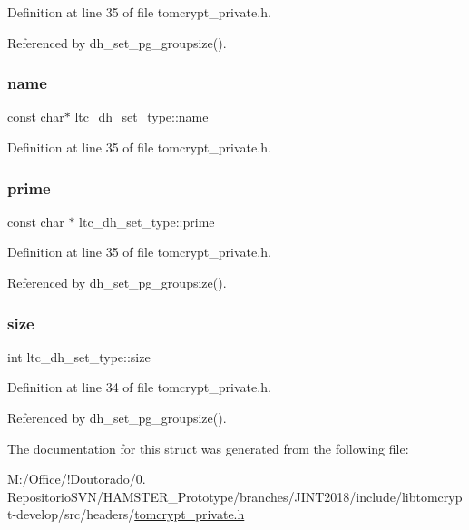 Definition at line 35 of file tomcrypt\+\_\+private.\+h.



Referenced by dh\+\_\+set\+\_\+pg\+\_\+groupsize().

\mbox{\label{structltc__dh__set__type_ac610a2795fa141eb47c6bc75db1f100d}} 
\subsubsection{\texorpdfstring{name}{name}}
{\footnotesize\ttfamily const char$\ast$ ltc\+\_\+dh\+\_\+set\+\_\+type\+::name}



Definition at line 35 of file tomcrypt\+\_\+private.\+h.

\mbox{\label{structltc__dh__set__type_a075dd36bc203e54e802194a7a0ac4d0a}} 
\subsubsection{\texorpdfstring{prime}{prime}}
{\footnotesize\ttfamily const char $\ast$ ltc\+\_\+dh\+\_\+set\+\_\+type\+::prime}



Definition at line 35 of file tomcrypt\+\_\+private.\+h.



Referenced by dh\+\_\+set\+\_\+pg\+\_\+groupsize().

\mbox{\label{structltc__dh__set__type_a2b9cb28186fe61b5f2c86195af6fb397}} 
\subsubsection{\texorpdfstring{size}{size}}
{\footnotesize\ttfamily int ltc\+\_\+dh\+\_\+set\+\_\+type\+::size}



Definition at line 34 of file tomcrypt\+\_\+private.\+h.



Referenced by dh\+\_\+set\+\_\+pg\+\_\+groupsize().



The documentation for this struct was generated from the following file\+:\begin{DoxyCompactItemize}
\item 
M\+:/\+Office/!\+Doutorado/0. Repositorio\+S\+V\+N/\+H\+A\+M\+S\+T\+E\+R\+\_\+\+Prototype/branches/\+J\+I\+N\+T2018/include/libtomcrypt-\/develop/src/headers/\mbox{\hyperlink{tomcrypt__private_8h}{tomcrypt\+\_\+private.\+h}}\end{DoxyCompactItemize}
